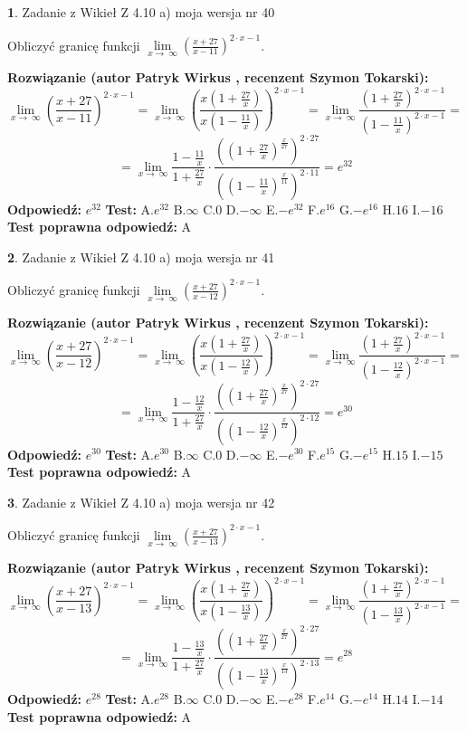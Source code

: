 \documentclass[12pt, a4paper]{article}
\theoremstyle{definition} %
\newtheorem{zad}{}
\newcommand{\zadStart}[1]{\begin{zad}#1\newline}
\newcommand{\zadStop}{\end{zad}}
\newcommand{\rozwStart}[2]{\noindent \textbf{Rozwiązanie (autor #1 , recenzent #2): }\newline}
\newcommand{\rozwStop}{\newline}
\newcommand{\odpStart}{\noindent \textbf{Odpowiedź:}\newline}
\newcommand{\odpStop}{\newline}
\newcommand{\testStart}{\noindent \textbf{Test:}\newline}
\newcommand{\testStop}{\newline}
\newcommand{\kluczStart}{\noindent \textbf{Test poprawna odpowiedź:}\newline}
\newcommand{\kluczStop}{\newline}
\begin{document}
\zadStart{Zadanie z Wikieł Z 4.10 a) moja wersja nr 40}

Obliczyć granicę funkcji  $\lim\limits_{x\to\ \infty}(\frac{x+27}{x-11})^{2\cdot x-1}$.
\zadStop
\rozwStart{Patryk Wirkus}{Szymon Tokarski}
$$\lim\limits_{x\to\ \infty}(\frac{x+27}{x-11})^{2\cdot x-1} = \lim\limits_{x\to\ \infty}(\frac{x(1+\frac{27}{x})}{x(1-\frac{11}{x})})^{2\cdot x-1}=\lim\limits_{x\to\ \infty}\frac{(1+\frac{27}{x})^{2\cdot x-1}}{(1-\frac{11}{x})^{2\cdot x-1}}=$$
$$=\lim\limits_{x\to\ \infty}\frac{1-\frac{11}{x}}{1+\frac{27}{x}}\cdot\frac{((1+\frac{27}{x})^{\frac{x}{27}})^{2\cdot27}}{((1-\frac{11}{x})^{\frac{x}{11}})^{2\cdot11}}=e^{32}$$
\rozwStop
\odpStart
$e^{32}$
\odpStop
\testStart
A.$e^{32}$ B.$\infty$ C.$0$ D.$-\infty$ E.$-e^{32}$
F.$e^{16}$ G.$-e^{16}$
H.$16$
I.$-16$
\testStop
\kluczStart
A
\kluczStop



\zadStart{Zadanie z Wikieł Z 4.10 a) moja wersja nr 41}

Obliczyć granicę funkcji  $\lim\limits_{x\to\ \infty}(\frac{x+27}{x-12})^{2\cdot x-1}$.
\zadStop
\rozwStart{Patryk Wirkus}{Szymon Tokarski}
$$\lim\limits_{x\to\ \infty}(\frac{x+27}{x-12})^{2\cdot x-1} = \lim\limits_{x\to\ \infty}(\frac{x(1+\frac{27}{x})}{x(1-\frac{12}{x})})^{2\cdot x-1}=\lim\limits_{x\to\ \infty}\frac{(1+\frac{27}{x})^{2\cdot x-1}}{(1-\frac{12}{x})^{2\cdot x-1}}=$$
$$=\lim\limits_{x\to\ \infty}\frac{1-\frac{12}{x}}{1+\frac{27}{x}}\cdot\frac{((1+\frac{27}{x})^{\frac{x}{27}})^{2\cdot27}}{((1-\frac{12}{x})^{\frac{x}{12}})^{2\cdot12}}=e^{30}$$
\rozwStop
\odpStart
$e^{30}$
\odpStop
\testStart
A.$e^{30}$ B.$\infty$ C.$0$ D.$-\infty$ E.$-e^{30}$
F.$e^{15}$ G.$-e^{15}$
H.$15$
I.$-15$
\testStop
\kluczStart
A
\kluczStop



\zadStart{Zadanie z Wikieł Z 4.10 a) moja wersja nr 42}

Obliczyć granicę funkcji  $\lim\limits_{x\to\ \infty}(\frac{x+27}{x-13})^{2\cdot x-1}$.
\zadStop
\rozwStart{Patryk Wirkus}{Szymon Tokarski}
$$\lim\limits_{x\to\ \infty}(\frac{x+27}{x-13})^{2\cdot x-1} = \lim\limits_{x\to\ \infty}(\frac{x(1+\frac{27}{x})}{x(1-\frac{13}{x})})^{2\cdot x-1}=\lim\limits_{x\to\ \infty}\frac{(1+\frac{27}{x})^{2\cdot x-1}}{(1-\frac{13}{x})^{2\cdot x-1}}=$$
$$=\lim\limits_{x\to\ \infty}\frac{1-\frac{13}{x}}{1+\frac{27}{x}}\cdot\frac{((1+\frac{27}{x})^{\frac{x}{27}})^{2\cdot27}}{((1-\frac{13}{x})^{\frac{x}{13}})^{2\cdot13}}=e^{28}$$
\rozwStop
\odpStart
$e^{28}$
\odpStop
\testStart
A.$e^{28}$ B.$\infty$ C.$0$ D.$-\infty$ E.$-e^{28}$
F.$e^{14}$ G.$-e^{14}$
H.$14$
I.$-14$
\testStop
\kluczStart
A
\kluczStop
\end{document}
